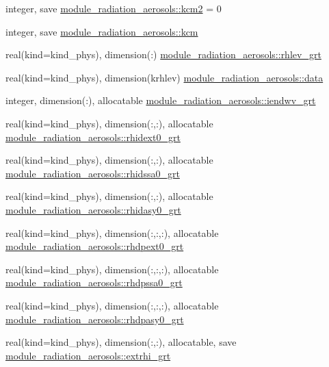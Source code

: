 \begin{DoxyCompactItemize}
\item 
integer, save \hyperlink{namespacemodule__radiation__aerosols_ab2be28697a95bcec8d5cd8de7ebd4328}{module\+\_\+radiation\+\_\+aerosols\+::kcm2} = 0
\item 
integer, save \hyperlink{namespacemodule__radiation__aerosols_a4816bc93b826ff2fad9ff0805ea39fd5}{module\+\_\+radiation\+\_\+aerosols\+::kcm}
\item 
real(kind=kind\+\_\+phys), dimension(\+:) \hyperlink{namespacemodule__radiation__aerosols_ace40d50e36de1fc08c4ff35f6d8dbda9}{module\+\_\+radiation\+\_\+aerosols\+::rhlev\+\_\+grt}
\item 
real(kind=kind\+\_\+phys), dimension(krhlev) \hyperlink{namespacemodule__radiation__aerosols_a1248e740e53498ed7a06f7d475b1fb25}{module\+\_\+radiation\+\_\+aerosols\+::data}
\item 
integer, dimension(\+:), allocatable \hyperlink{namespacemodule__radiation__aerosols_ac755c4235327053fff060ffa3b2ee2a3}{module\+\_\+radiation\+\_\+aerosols\+::iendwv\+\_\+grt}
\item 
real(kind=kind\+\_\+phys), dimension(\+:,\+:), allocatable \hyperlink{namespacemodule__radiation__aerosols_a6683021bded82850053c16eb3e906998}{module\+\_\+radiation\+\_\+aerosols\+::rhidext0\+\_\+grt}
\item 
real(kind=kind\+\_\+phys), dimension(\+:,\+:), allocatable \hyperlink{namespacemodule__radiation__aerosols_aea46db63db26a316e73640bc63f75383}{module\+\_\+radiation\+\_\+aerosols\+::rhidssa0\+\_\+grt}
\item 
real(kind=kind\+\_\+phys), dimension(\+:,\+:), allocatable \hyperlink{namespacemodule__radiation__aerosols_a8491a714c86e9bd7ebdc401662f5068e}{module\+\_\+radiation\+\_\+aerosols\+::rhidasy0\+\_\+grt}
\item 
real(kind=kind\+\_\+phys), dimension(\+:,\+:,\+:), allocatable \hyperlink{namespacemodule__radiation__aerosols_a35a5c7b67a3cf11c5016a693e115d384}{module\+\_\+radiation\+\_\+aerosols\+::rhdpext0\+\_\+grt}
\item 
real(kind=kind\+\_\+phys), dimension(\+:,\+:,\+:), allocatable \hyperlink{namespacemodule__radiation__aerosols_a40d680662eadf30221997dadcce734b1}{module\+\_\+radiation\+\_\+aerosols\+::rhdpssa0\+\_\+grt}
\item 
real(kind=kind\+\_\+phys), dimension(\+:,\+:,\+:), allocatable \hyperlink{namespacemodule__radiation__aerosols_ab5a0bbefbfed6b393f0abad26e6e4d04}{module\+\_\+radiation\+\_\+aerosols\+::rhdpasy0\+\_\+grt}
\item 
real(kind=kind\+\_\+phys), dimension(\+:,\+:), allocatable, save \hyperlink{namespacemodule__radiation__aerosols_acb7ff037be78e950ea42d956816c93d5}{module\+\_\+radiation\+\_\+aerosols\+::extrhi\+\_\+grt}

\end{DoxyCompactItemize}
